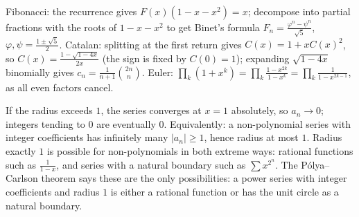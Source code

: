 \documentclass[11pt,a4paper]{article}
\begin{document}
Fibonacci: the recurrence gives \(F(x)(1-x-x^2)=x\); decompose into partial fractions with the roots of \(1-x-x^2\) to get Binet's formula \(F_n=\frac{\varphi^n-\psi^n}{\sqrt5}\), \(\varphi,\psi=\frac{1\pm\sqrt5}2\).
Catalan: splitting at the first return gives \(C(x)=1+xC(x)^2\), so \(C(x)=\frac{1-\sqrt{1-4x}}{2x}\) (the sign is fixed by \(C(0)=1\)); expanding \(\sqrt{1-4x}\) binomially gives \(c_n=\frac1{n+1}\binom{2n}n\). Euler: \(\prod_k(1+x^k)=\prod_k\frac{1-x^{2k}}{1-x^k}=\prod_k\frac1{1-x^{2k-1}}\), as all even factors cancel.

If the radius exceeds \(1\), the series converges at \(x=1\) absolutely, so \(a_n\to0\); integers tending to \(0\) are eventually \(0\). Equivalently: a non-polynomial series with integer coefficients has infinitely many \(\lvert a_n\rvert\ge1\), hence radius at most \(1\).
Radius exactly \(1\) is possible for non-polynomials in both extreme ways: rational functions such as \(\frac1{1-x}\), and series with a natural boundary such as \(\sum x^{2^n}\). The Pólya--Carlson theorem says these are the only possibilities: a power series with integer coefficients and radius \(1\) is either a rational function or has the unit circle as a natural boundary.
\end{document}
